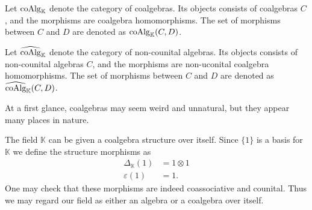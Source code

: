 \documentclass[../thesis.tex]{subfiles}
\begin{document}
            \begin{definition}
                Let $\tt{coAlg}_{\mathbb{K}}$ denote the category of coalgebras. Its objects consists of coalgebras $C$, and the morphisms are coalgebra homomorphisms. The set of morphisms between $C$ and $D$ are denoted as $\tt{coAlg}_{\mathbb{K}}(C,D)$.
                
                Let $\widehat{\tt{coAlg}}_{\mathbb{K}}$ denote the category of non-counital algebras. Its objects consists of non-counital algebras $C$, and the morphisms are non-uconital coalgebra homomorphisms. The set of morphisms between $C$ and $D$ are denoted as $\widehat{\tt{coAlg}}_{\mathbb{K}}(C,D)$.
            \end{definition}

            At a first glance, coalgebras may seem weird and unnatural, but they appear many places in nature.

            \begin{example}
                The field $\mathbb{K}$ can be given a coalgebra structure over itself. Since $\{1\}$ is a basis for $\mathbb{K}$ we define the structure morphisms as
                \begin{align*}
                    \Delta_{\mathbb{K}}(1) & = 1\otimes 1 \\
                    \varepsilon(1) & = 1.
                \end{align*}
                One may check that these morphisms are indeed coassociative and counital. Thus we may regard our field as either an algebra or a coalgebra over itself.
            \end{example}
\end{document}
